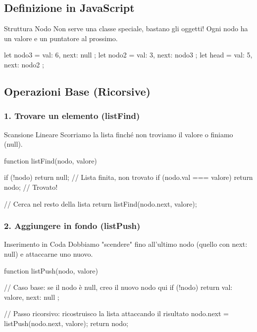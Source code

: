 \subsection{Definizione in JavaScript}
\begin{concept}{Struttura Nodo}
Non serve una classe speciale, bastano gli oggetti!
Ogni nodo ha un valore e un puntatore al prossimo.
\end{concept}
\begin{jsbox}
let nodo3 = { val: 6, next: null };
let nodo2 = { val: 3, next: nodo3 };
let head  = { val: 5, next: nodo2 };
\end{jsbox}

\subsection{Operazioni Base (Ricorsive)}

\subsubsection{1. Trovare un elemento (listFind)}
\begin{concept}{Scansione Lineare}
Scorriamo la lista finché non troviamo il valore o finiamo (null).
\end{concept}
\begin{jsbox}
function listFind(nodo, valore) {
    if (!nodo) return null; // Lista finita, non trovato
    if (nodo.val === valore) return nodo; // Trovato!
    
    // Cerca nel resto della lista
    return listFind(nodo.next, valore);
}
\end{jsbox}

\subsubsection{2. Aggiungere in fondo (listPush)}
\begin{concept}{Inserimento in Coda}
Dobbiamo "scendere" fino all'ultimo nodo (quello con next: null) e attaccarne uno nuovo.
\end{concept}
\begin{jsbox}
function listPush(nodo, valore) {
    // Caso base: se il nodo è null, creo il nuovo nodo qui
    if (!nodo) {
        return { val: valore, next: null };
    }
    
    // Passo ricorsivo: ricostruisco la lista attaccando il risultato
    nodo.next = listPush(nodo.next, valore);
    return nodo;
}
\end{jsbox}

